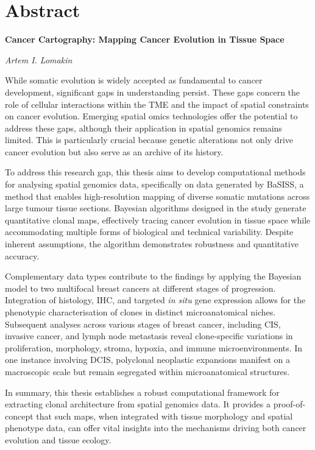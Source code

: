 \chapter*{Abstract}
\vspace*{-1cm}
{\large\textbf{Cancer Cartography: Mapping Cancer Evolution in Tissue Space}}

{\noindent\textit{Artem I. Lomakin}}

\vspace{0.25cm}

While somatic evolution is widely accepted as fundamental to cancer development, significant gaps in understanding persist. These gaps concern the role of cellular interactions within the \acf{TME} and the impact of spatial constraints on cancer evolution. Emerging spatial omics technologies offer the potential to address these gaps, although their application in spatial genomics remains limited. This is particularly crucial because genetic alterations not only drive cancer evolution but also serve as an archive of its history.

To address this research gap, this thesis aims to develop computational methods for analysing spatial genomics data, specifically on data generated by \acf{BaSISS}, a method that enables high-resolution mapping of diverse somatic mutations across large tumour tissue sections. Bayesian algorithms designed in the study generate quantitative clonal maps, effectively tracing cancer evolution in tissue space while accommodating multiple forms of biological and technical variability. Despite inherent assumptions, the algorithm demonstrates robustness and quantitative accuracy.

Complementary data types contribute to the findings by applying the Bayesian model to two multifocal breast cancers at different stages of progression. Integration of histology, \acf{IHC}, and targeted \textit{in situ} gene expression allows for the phenotypic characterisation of clones in distinct microanatomical niches. Subsequent analyses across various stages of breast cancer, including \acl{CIS}, invasive cancer, and lymph node metastasis reveal clone-specific variations in proliferation, morphology, stroma, hypoxia, and immune microenvironments. In one instance involving \acl{DCIS}, polyclonal neoplastic expansions manifest on a macroscopic scale but remain segregated within microanatomical structures. 

In summary, this thesis establishes a robust computational framework for extracting clonal architecture from spatial genomics data. It provides a proof-of-concept that such maps, when integrated with tissue morphology and spatial phenotype data, can offer vital insights into the mechanisms driving both cancer evolution and tissue ecology.



